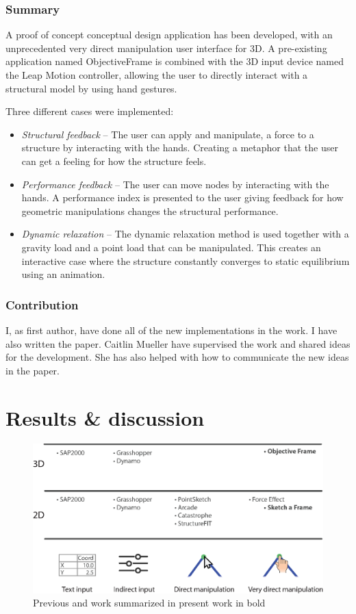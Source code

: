 \subsection*{Summary}

A proof of concept conceptual design application has been developed, with an unprecedented very direct manipulation user interface for 3D. A pre-existing application named ObjectiveFrame \cite{lindemann2001objectiveframe} is combined with the 3D input device named the Leap Motion controller, allowing the user to directly interact with a structural model by using hand gestures.

Three different cases were implemented:

\begin{itemize} 
\item \textit{Structural feedback} – The user can apply and manipulate, a force to a structure by interacting with the hands. Creating a metaphor that the user can get a feeling for how the structure feels.
\item \textit{Performance feedback} – The user can move nodes by interacting with the hands. A performance index is presented to the user giving feedback for how geometric manipulations changes the structural performance.
\item \textit{Dynamic relaxation} – The dynamic relaxation method is used together with a gravity load and a point load that can be manipulated. This creates an interactive case where the structure constantly converges to static equilibrium using an animation.
\end{itemize} 

\subsection*{Contribution}

I, as first author, have done all of the new implementations in the work. I have also written the paper. Caitlin Mueller have supervised the work and shared ideas for the development. She has also helped with how to communicate the new ideas in the paper.

\chapter{Results \& discussion}
\label{ch:Results discussion}
\begin{figure}
  \includegraphics[width=330pt]{graphics/softwareReview.eps}
  \caption{Previous and work summarized in present work in bold}
  \label{fig:softwareReview}
\end{figure}

